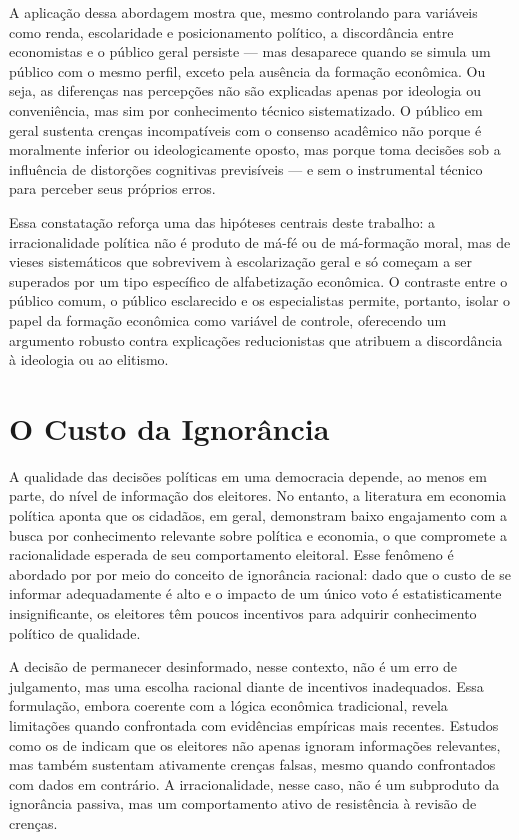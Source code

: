 A aplicação dessa abordagem mostra que, mesmo controlando para variáveis como renda, escolaridade e posicionamento político, a discordância entre economistas e o público geral persiste — mas desaparece quando se simula um público com o mesmo perfil, exceto pela ausência da formação econômica. Ou seja, as diferenças nas percepções não são explicadas apenas por ideologia ou conveniência, mas sim por conhecimento técnico sistematizado. O público em geral sustenta crenças incompatíveis com o consenso acadêmico não porque é moralmente inferior ou ideologicamente oposto, mas porque toma decisões sob a influência de distorções cognitivas previsíveis — e sem o instrumental técnico para perceber seus próprios erros.

Essa constatação reforça uma das hipóteses centrais deste trabalho: a irracionalidade política não é produto de má-fé ou de má-formação moral, mas de vieses sistemáticos que sobrevivem à escolarização geral e só começam a ser superados por um tipo específico de alfabetização econômica. O contraste entre o público comum, o público esclarecido e os especialistas permite, portanto, isolar o papel da formação econômica como variável de controle, oferecendo um argumento robusto contra explicações reducionistas que atribuem a discordância à ideologia ou ao elitismo.

\section{O Custo da Ignorância} %


A qualidade das decisões políticas em uma democracia depende, ao menos em parte, do nível de informação dos eleitores. No entanto, a literatura em economia política aponta que os cidadãos, em geral, demonstram baixo engajamento com a busca por conhecimento relevante sobre política e economia, o que compromete a racionalidade esperada de seu comportamento eleitoral. Esse fenômeno é abordado por  por meio do conceito de ignorância racional: dado que o custo de se informar adequadamente é alto e o impacto de um único voto é estatisticamente insignificante, os eleitores têm poucos incentivos para adquirir conhecimento político de qualidade.

A decisão de permanecer desinformado, nesse contexto, não é um erro de julgamento, mas uma escolha racional diante de incentivos inadequados. Essa formulação, embora coerente com a lógica econômica tradicional, revela limitações quando confrontada com evidências empíricas mais recentes. Estudos como os de  indicam que os eleitores não apenas ignoram informações relevantes, mas também sustentam ativamente crenças falsas, mesmo quando confrontados com dados em contrário. A irracionalidade, nesse caso, não é um subproduto da ignorância passiva, mas um comportamento ativo de resistência à revisão de crenças.

